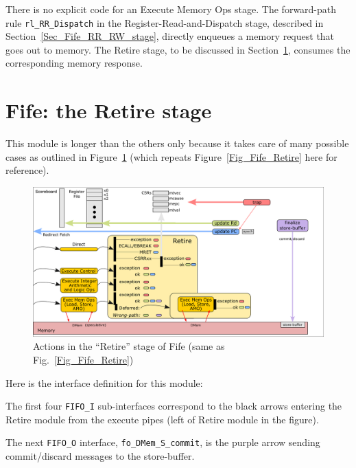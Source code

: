 There is no explicit code for an Execute Memory Ops stage.  The
forward-path rule \verb|rl_RR_Dispatch| in the
Register-Read-and-Dispatch stage, described in
Section~\ref{Sec_Fife_RR_RW_stage}, directly enqueues a memory request
that goes out to memory.  The Retire stage, to be discussed in
Section~\ref{Sec_Fife_Retire_code}, consumes the corresponding memory
response.


\section{Fife: the Retire stage}

\label{Sec_Fife_Retire_code}

This module is longer than the others only because it takes care of
many possible cases as outlined in Figure~\ref{Fig_Fife_Retire_2}
(which repeats Figure~\ref{Fig_Fife_Retire} here for reference).
\begin{figure}[htbp]
  \centerline{\includegraphics[width=6in,angle=0]{Figures/Fig_Retire_Layers_1_2}}
  \caption{\label{Fig_Fife_Retire_2}
           Actions in the ``Retire'' stage of Fife
	   (same as Fig.~\ref{Fig_Fife_Retire})}
\end{figure}

Here is the interface definition for this module:



The first four \verb|FIFO_I| sub-interfaces correspond to the black
arrows entering the Retire module from the execute pipes (left of
Retire module in the figure).

The next \verb|FIFO_O| interface, \verb|fo_DMem_S_commit|, is the
purple arrow sending commit/discard messages to the store-buffer.

